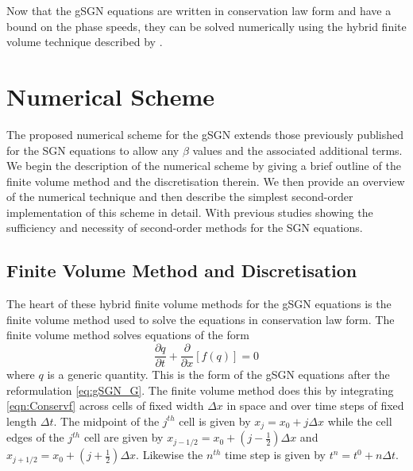 \documentclass[10pt]{elsarticle}
\begin{document}
Now that the gSGN equations are written in conservation law form and have a bound on the phase speeds, they can be solved numerically using the hybrid finite volume technique described by \citet{Zoppou-etal-2017}.

\section{Numerical Scheme}
The proposed numerical scheme for the gSGN extends those previously published for the SGN equations \cite{Zoppou-etal-2017,Hank-etal-2010-2034} to allow any $\beta$ values and the associated additional terms. We begin the description of the numerical scheme by giving a brief outline of the finite volume method and the discretisation therein. We then provide an overview of the numerical technique and then describe the simplest second-order implementation of this scheme in detail. With previous studies \cite{Zoppou-etal-2017,Pitt-2019} showing the sufficiency and necessity of second-order methods for the SGN equations. 

\subsection{Finite Volume Method and Discretisation}
The heart of these hybrid finite volume methods for the gSGN equations is the finite volume method used to solve the equations in conservation law form. The finite volume method solves equations of the form 
\begin{equation}
\label{eqn:Conservf}
\frac{\partial q}{\partial t} + \frac{\partial}{\partial x}\left[f(q)\right] = 0
\end{equation}
where $q$ is a generic quantity. This is the form of the gSGN equations after the reformulation \eqref{eq:gSGN_G}. The finite volume method does this by integrating \eqref{eqn:Conservf} across cells of fixed width $\Delta x$ in space and over time steps of fixed length $\Delta t$.  The midpoint of the $j^{th}$ cell is given by $x_j = x_0 + j \Delta x$ while the cell edges of the $j^{th}$ cell are given by $x_{j-1/2} = x_0 + (j - \frac{1}{2}) \Delta x$ and $x_{j+1/2} = x_0 + (j + \frac{1}{2}) \Delta x$. Likewise the $n^{th}$ time step is given by $t^n = t^0 + n \Delta t$. 
\end{document}
